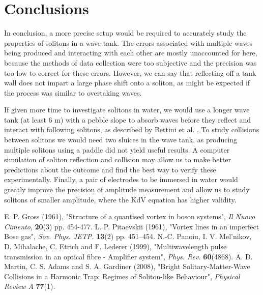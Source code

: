 \documentclass[10pt, twocolumn]{revtex4}    %
\begin{document}

\section{Conclusions}
 
In conclusion, a more precise setup would be required to accurately study the properties of solitons in a wave tank. The errors associated with multiple waves being produced and interacting with each other are mostly unaccounted for here, because the methods of data collection were too subjective and the precision was too low to correct for these errors. However, we can say that reflecting off a tank wall does not impart a large phase shift onto a soliton, as might be expected if the process was similar to overtaking waves. 

If given more time to investigate solitons in water, we would use a longer wave tank (at least 6 m) with a pebble slope to absorb waves before they reflect and interact with following solitons, as described by Bettini et al. \cite{UGlab}. To study collisions between solitons we would need two sluices in the wave tank, as producing multiple solitons using a paddle did not yield useful results. A computer simulation of soliton reflection and collision may allow us to make better predictions about the outcome and find the best way to verify these experimentally. Finally, a pair of electrodes to be immersed in water would greatly improve the precision of amplitude measurement and allow us to study solitons of smaller amplitude, where the KdV equation has higher validity. 


\begin{thebibliography}{}

 E. P. Gross (1961), "Structure of a quantised vortex in boson systems", \textit{Il Nuovo Cimento}, \textbf{20}(3) pp. 454-477. 
  L. P. Pitaevskii (1961), "Vortex lines in an imperfect Bose gas", \textit{Sov. Phys. JETP.} \textbf{13}(2) pp. 451–454.
 N.-C. Panoiu, I. V. Mel’nikov, D. Mihalache, C. Etrich and F. Lederer (1999), "Multiwavelength pulse transmission in an optical fibre - Amplifier system", \textit{Phys. Rev.} \textbf{60}(4868).
 A. D. Martin, C. S. Adams and S. A. Gardiner (2008), "Bright Solitary-Matter-Wave Collisions in a Harmonic Trap: Regimes of Soliton-like Behaviour", \textit{Physical Review A} \textbf{77}(1). 

\end{thebibliography} 
\end{document}
